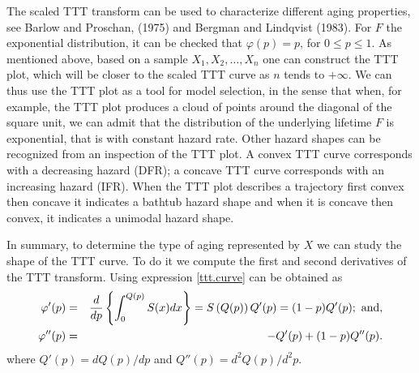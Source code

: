 \documentclass[preprint,12pt]{elsarticle}
\newtheorem{ex}{{\sc Example}}[section]
\begin{document}
\noindent The scaled TTT transform can be used to characterize different aging properties, see Barlow and Proschan, (1975) and Bergman and Lindqvist (1983). For $F$ the exponential distribution, it can be checked that $\varphi(p)=p$, for $0 \leq p \leq 1$. As mentioned above, based on a sample $X_1,X_2,\ldots, X_n$ one can construct the TTT plot, which will be closer to the scaled TTT curve as $n$ tends to $+\infty$. We can thus use the TTT plot as a tool for model selection, in the sense that when, for example, the TTT plot produces a cloud of points around the diagonal of the square unit, we can admit that the distribution of the underlying lifetime $F$ is exponential, that is with constant hazard rate. Other hazard shapes can be recognized from an inspection of the TTT plot. A convex TTT curve corresponds with a decreasing hazard (DFR); a concave TTT curve corresponds with an increasing hazard (IFR). When the TTT plot describes a trajectory first convex then concave it indicates a bathtub hazard shape and when it is concave then convex, it indicates a unimodal hazard shape. 

In summary, to determine the type of aging represented by $X$ we can study the shape of the TTT curve. To do it we compute the first and second derivatives of the TTT transform. Using expression \eqref{ttt.curve} can be obtained as
\begin{eqnarray*}
\varphi'(p)&=& \frac{d}{d p}\left\{\int_0^{Q(p)}S(x)dx\right\}=S\left(Q(p)\right)Q'(p)=(1-p)Q'(p); \ {\rm and}, \\
\varphi''(p)&=& -Q'(p)+(1-p)Q''(p). 
\end{eqnarray*}
where $Q'(p)=dQ(p)/dp$ and $Q''(p)=d^2Q(p)/d^2p$.

\end{document}
